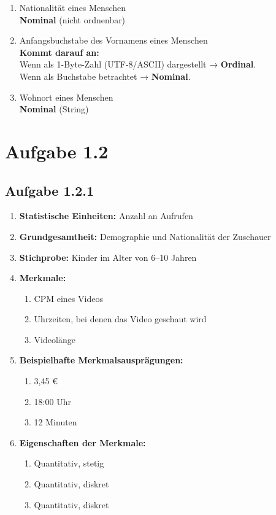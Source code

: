 \documentclass[a4paper,12pt]{article}
\begin{document}
\begin{enumerate}
		\item Nationalität eines Menschen\\
		\textbf{Nominal} (nicht ordnenbar)
		
		\item Anfangsbuchstabe des Vornamens eines Menschen\\
		\textbf{Kommt darauf an:}\\
		Wenn als 1-Byte-Zahl (UTF-8/ASCII) dargestellt → \textbf{Ordinal}.\\
		Wenn als Buchstabe betrachtet → \textbf{Nominal}.
		
		\item Wohnort eines Menschen\\
		\textbf{Nominal} (String)
	\end{enumerate}
	
	\section*{Aufgabe 1.2}
	\subsection*{Aufgabe 1.2.1}
	
	\begin{enumerate}
		\item \textbf{Statistische Einheiten:} Anzahl an Aufrufen
		\item \textbf{Grundgesamtheit:} Demographie und Nationalität der Zuschauer
		\item \textbf{Stichprobe:} Kinder im Alter von 6–10 Jahren
		\item \textbf{Merkmale:}
		\begin{enumerate}
			\item CPM eines Videos
			\item Uhrzeiten, bei denen das Video geschaut wird
			\item Videolänge
		\end{enumerate}
		\item \textbf{Beispielhafte Merkmalsausprägungen:}
		\begin{enumerate}
			\item 3{,}45 €
			\item 18:00 Uhr
			\item 12 Minuten
		\end{enumerate}
		\item \textbf{Eigenschaften der Merkmale:}
		\begin{enumerate}
			\item Quantitativ, stetig
			\item Quantitativ, diskret
			\item Quantitativ, diskret
		\end{enumerate}
	\end{enumerate}
	
\end{document}
